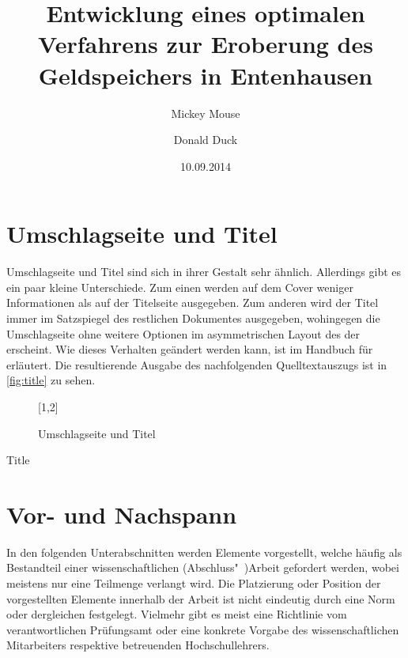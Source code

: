 \documentclass[%
  english,ngerman,%
  geometry=no,DIV=12,automark,%
]{tudscrartcl}
\begin{document}
\section{Umschlagseite und Titel}
Umschlagseite und Titel sind sich in ihrer Gestalt sehr ähnlich. Allerdings 
gibt es ein paar kleine Unterschiede. Zum einen werden auf dem Cover weniger 
Informationen als auf der Titelseite ausgegeben. Zum anderen wird der Titel 
immer im Satzspiegel des restlichen Dokumentes ausgegeben, wohingegen die 
Umschlagseite ohne weitere Optionen im asymmetrischen Layout des \CDs der \TnUD 
erscheint. Wie dieses Verhalten geändert werden kann, ist im Handbuch für 
 erläutert. Die resultierende Ausgabe des nachfolgenden 
Quelltextauszugs ist in \autoref{fig:title} zu sehen.
%
\begin{figure}
[1,2]
\caption{Umschlagseite und Titel}
\label{fig:title}
\end{figure}
\begin{Trunk!}{Title}
\title{%
  Entwicklung eines optimalen Verfahrens zur Eroberung des
  Geldspeichers in Entenhausen
}
\author{%
  Mickey Mouse
\and%
  Donald Duck
}
\date{10.09.2014}

\makecover
\maketitle

\end{Trunk!}



\section{Vor- und Nachspann}
In den folgenden Unterabschnitten werden Elemente vorgestellt, welche häufig 
als Bestandteil einer wissenschaftlichen (Abschluss"~)Arbeit gefordert werden, 
wobei meistens nur eine Teilmenge verlangt wird. Die Platzierung oder Position 
der vorgestellten Elemente innerhalb der Arbeit ist nicht eindeutig durch eine 
Norm oder dergleichen festgelegt. Vielmehr gibt es meist eine Richtlinie vom 
verantwortlichen Prüfungsamt oder eine konkrete Vorgabe des wissenschaftlichen 
Mitarbeiters respektive betreuenden Hochschullehrers.
\end{document}
